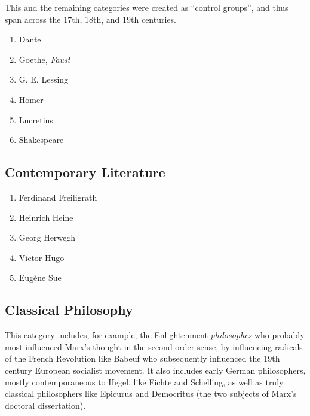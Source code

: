 This and the remaining categories were created as ``control groups'', and thus span across the 17th, 18th, and 19th centuries.

\begin{enumerate}
    \item Dante
    \item Goethe, \textit{Faust}
    \item G. E. Lessing
    \item Homer
    \item Lucretius
    \item Shakespeare
\end{enumerate}

\subsection{Contemporary Literature}

\begin{enumerate}
    \item Ferdinand Freiligrath
    \item Heinrich Heine
    \item Georg Herwegh
    \item Victor Hugo
    \item Eugène Sue
\end{enumerate}

\subsection{Classical Philosophy}

This category includes, for example, the Enlightenment \textit{philosophes} who probably most influenced Marx's thought in the second-order sense, by influencing radicals of the French Revolution like Babeuf who subsequently influenced the 19th century European socialist movement. It also includes early German philosophers, mostly contemporaneous to Hegel, like Fichte and Schelling, as well as truly classical philosophers like Epicurus and Democritus (the two subjects of Marx's doctoral dissertation).

